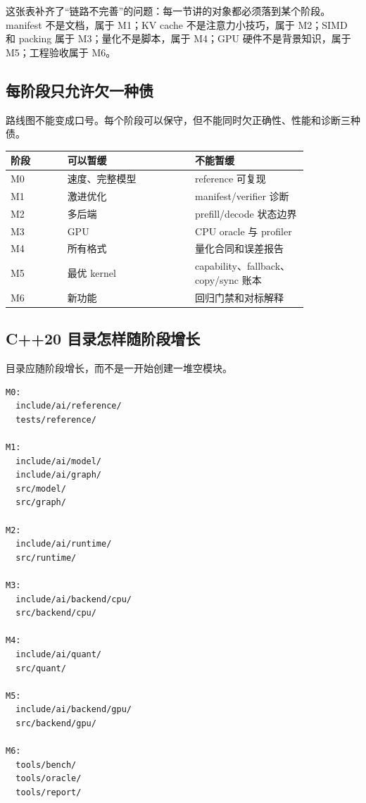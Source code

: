 这张表补齐了“链路不完善”的问题：每一节讲的对象都必须落到某个阶段。manifest 不是文档，属于 M1；KV cache 不是注意力小技巧，属于 M2；SIMD 和 packing 属于 M3；量化不是脚本，属于 M4；GPU 硬件不是背景知识，属于 M5；工程验收属于 M6。

\subsection{每阶段只允许欠一种债}

路线图不能变成口号。每个阶段可以保守，但不能同时欠正确性、性能和诊断三种债。

\begin{center}
\begin{tabular}{p{0.16\linewidth}p{0.36\linewidth}p{0.32\linewidth}}
\toprule
阶段 & 可以暂缓 & 不能暂缓 \\
\midrule
M0 & 速度、完整模型 & reference 可复现 \\
M1 & 激进优化 & manifest/verifier 诊断 \\
M2 & 多后端 & prefill/decode 状态边界 \\
M3 & GPU & CPU oracle 与 profiler \\
M4 & 所有格式 & 量化合同和误差报告 \\
M5 & 最优 kernel & capability、fallback、copy/sync 账本 \\
M6 & 新功能 & 回归门禁和对标解释 \\
\bottomrule
\end{tabular}
\end{center}

\subsection{C++20 目录怎样随阶段增长}

目录应随阶段增长，而不是一开始创建一堆空模块。

\begin{lstlisting}[numbers=none,caption={目录增长路线}]
M0:
  include/ai/reference/
  tests/reference/

M1:
  include/ai/model/
  include/ai/graph/
  src/model/
  src/graph/

M2:
  include/ai/runtime/
  src/runtime/

M3:
  include/ai/backend/cpu/
  src/backend/cpu/

M4:
  include/ai/quant/
  src/quant/

M5:
  include/ai/backend/gpu/
  src/backend/gpu/

M6:
  tools/bench/
  tools/oracle/
  tools/report/
\end{lstlisting}

